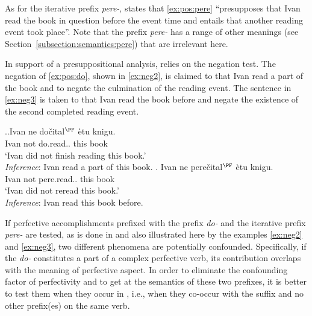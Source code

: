 As for the iterative prefix \textit{pere-}, \citet[145]{Kagan:book} states that \ref{ex:pos:pere} ``presupposes that Ivan read the book in question before the event time and entails that another reading event took place''. Note that the prefix \textit{pere-} has a range of other meanings (see Section~\ref{subsection:semantics:pere}) that are irrelevant here.

In support of a presuppositional analysis, \citet{Kagan:book} relies on the negation test. The negation of \ref{ex:pos:do}, shown in \ref{ex:neg2}, is claimed to  that Ivan read a part of the book and to negate the culmination of the reading event. The sentence in \ref{ex:neg3} is taken to  that Ivan read the book before and negate the existence of the second completed reading event.

\ex.\ag.\label{ex:neg2}Ivan ne do\v{c}ital$^{\PF}$ \`{e}tu knigu.\\
Ivan not do.read.. this book\\
\trans `Ivan did not finish reading this book.'\\
\textit{Inference}: Ivan read a part of this book.
\bg. \label{ex:neg3}Ivan ne pere\v{c}ital$^{\PF}$ \`{e}tu knigu.\\
Ivan not pere.read.. this book\\
\trans `Ivan did not reread this book.'\\
\textit{Inference}: Ivan read this book before.

If perfective accomplishments prefixed with the  prefix \textit{do-} and the iterative prefix \textit{pere-} are tested, as is done in \citealt{Kagan:book} and also illustrated here by the examples \ref{ex:neg2} and \ref{ex:neg3}, two different phenomena are potentially confounded. Specifically, if the  \textit{do-} constitutes a part of a complex perfective verb, its contribution overlaps with the meaning of perfective aspect. In order to eliminate the confounding factor of perfectivity and to get at the semantics of these two prefixes, it is better to test them when they occur in , i.e., when they co-occur with the  suffix and no other prefix(es) on the same verb.

